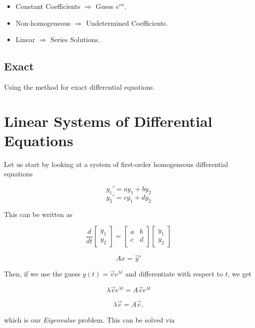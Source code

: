 \begin{itemize}

    \item Constant Coefficients \(\Rightarrow\) Guess \(e^{rx}\).

    \item Non-homogeneous \(\Rightarrow\) Undetermined Coefficients.

    \item Linear \(\Rightarrow\) Series Solutions.

\end{itemize}

\subsection{Exact}

Using the method for exact differential equations.

\section{Linear Systems of Differential Equations}

Let us start by looking at a system of first-order homogeneous differential equations

\[
    y_1 ' = ay_1 + by_2
\]
\[
    y_2 ' = cy_1 + dy_2
\]

This can be written as

\[
    \frac{d}{dt}
    \begin{bmatrix}
        y_1 \\
        y_2
    \end{bmatrix}
    =
    \begin{bmatrix}
        a & b \\
        c & d \\
    \end{bmatrix}
    \begin{bmatrix}
        y_1 \\
        y_2
    \end{bmatrix}
\]

\[
    Ax = \vec{y}'
\]

Then, if we use the guess \(y(t) = \vec{v} e^{\lambda t}\) and differentiate with respect to \(t\),
we get

\[
    \lambda \vec{v} e^{\lambda t} = A \vec{v} e^{\lambda t}
\]

\[
    \lambda \vec{v} = A \vec{v},
\]

which is our \emph{Eigenvalue} problem. This can be solved via

